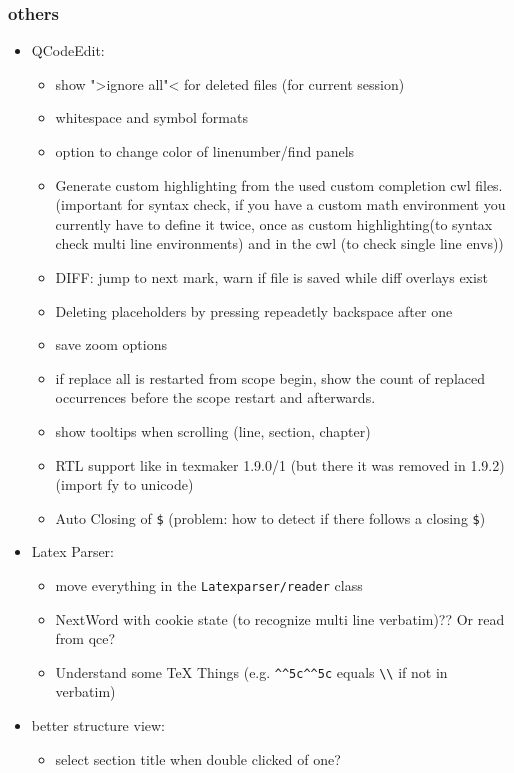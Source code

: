 \documentclass[10pt,a4paper,landscape]{report}
\begin{document}
\subsubsection{others}
\begin{itemize}
	\item QCodeEdit: \begin{itemize}
		\item show ">ignore all"< for deleted files (for current session)
		\item whitespace and symbol formats
		\item option to change color of linenumber/find panels
		\item Generate custom highlighting from the used custom completion cwl files. (important for syntax check, if you have a custom math environment you currently have to define it twice, once as custom highlighting(to syntax check multi line environments) and in the cwl (to check single line envs))
		\item DIFF: jump to next mark, warn if file is saved while diff overlays exist
		\item Deleting placeholders by pressing repeadetly backspace after one
		\item save zoom options
		\item if replace all is restarted from scope begin, show the count of replaced occurrences before the scope restart and afterwards.
		\item show tooltips when scrolling (line, section, chapter)
		\item RTL support like in texmaker 1.9.0/1 (but there it was removed in 1.9.2) (import fy to unicode)
		\item Auto Closing of \verb+$+ (problem: how to detect if there follows a closing \verb+$+)
	\end{itemize}
	\item Latex Parser: \begin{itemize}
		\item move everything in the \verb+Latexparser/reader+ class
		\item NextWord with cookie state (to recognize multi line verbatim)?? Or read from qce?
		\item Understand some TeX Things (e.g. \verb+^^5c^^5c+ equals \verb+\\+ if not in verbatim)
	\end{itemize}
	\item better structure view: \begin{itemize}
		\item select section title when double clicked of one?	

\end{itemize}
\end{itemize}
\end{document}
